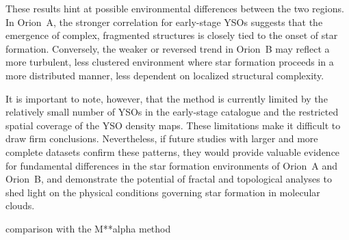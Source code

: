 These results hint at possible environmental differences between the two regions. In Orion~A, the stronger correlation for early-stage YSOs suggests that the emergence of complex, fragmented structures is closely tied to the onset of star formation. Conversely, the weaker or reversed trend in Orion~B may reflect a more turbulent, less clustered environment where star formation proceeds in a more distributed manner, less dependent on localized structural complexity.

It is important to note, however, that the method is currently limited by the relatively small number of YSOs in the early-stage catalogue and the restricted spatial coverage of the YSO density maps. These limitations make it difficult to draw firm conclusions. Nevertheless, if future studies with larger and more complete datasets confirm these patterns, they would provide valuable evidence for fundamental differences in the star formation environments of Orion~A and Orion~B, and demonstrate the potential of fractal and topological analyses to shed light on the physical conditions governing star formation in molecular clouds.



comparison with the M**alpha method
